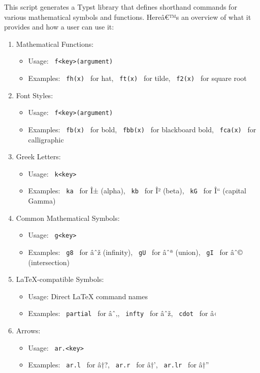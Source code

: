 This script generates a Typst library that defines shorthand commands
for various mathematical symbols and functions. Hereâ€™s an overview of
what it provides and how a user can use it:

\begin{enumerate}
\tightlist
\item
  Mathematical Functions:

  \begin{itemize}
  \tightlist
  \item
    Usage: \texttt{\ f\textless{}key\textgreater{}(argument)\ }
  \item
    Examples: \texttt{\ fh(x)\ } for hat, \texttt{\ ft(x)\ } for tilde,
    \texttt{\ f2(x)\ } for square root
  \end{itemize}
\item
  Font Styles:

  \begin{itemize}
  \tightlist
  \item
    Usage: \texttt{\ f\textless{}key\textgreater{}(argument)\ }
  \item
    Examples: \texttt{\ fb(x)\ } for bold, \texttt{\ fbb(x)\ } for
    blackboard bold, \texttt{\ fca(x)\ } for calligraphic
  \end{itemize}
\item
  Greek Letters:

  \begin{itemize}
  \tightlist
  \item
    Usage: \texttt{\ k\textless{}key\textgreater{}\ }
  \item
    Examples: \texttt{\ ka\ } for Î± (alpha), \texttt{\ kb\ } for Î²
    (beta), \texttt{\ kG\ } for Î`` (capital Gamma)
  \end{itemize}
\item
  Common Mathematical Symbols:

  \begin{itemize}
  \tightlist
  \item
    Usage: \texttt{\ g\textless{}key\textgreater{}\ }
  \item
    Examples: \texttt{\ g8\ } for âˆž (infinity), \texttt{\ gU\ } for
    âˆª (union), \texttt{\ gI\ } for âˆ© (intersection)
  \end{itemize}
\item
  LaTeX-compatible Symbols:

  \begin{itemize}
  \tightlist
  \item
    Usage: Direct LaTeX command names
  \item
    Examples: \texttt{\ partial\ } for âˆ‚, \texttt{\ infty\ } for âˆž,
    \texttt{\ cdot\ } for â‹
  \end{itemize}
\item
  Arrows:

  \begin{itemize}
  \tightlist
  \item
    Usage: \texttt{\ ar.\textless{}key\textgreater{}\ }
  \item
    Examples: \texttt{\ ar.l\ } for â†?, \texttt{\ ar.r\ } for â†',
    \texttt{\ ar.lr\ } for â†''
  \end{itemize}
\end{enumerate}

